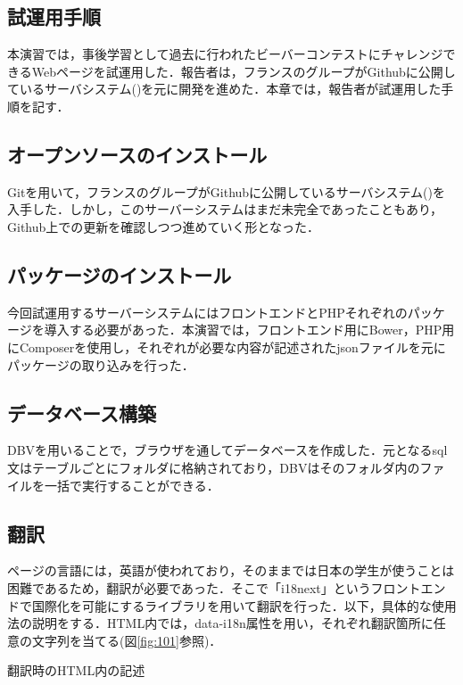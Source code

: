 \documentclass[a4paper]{jarticle}
\makeatletter
\newenvironment{figurehere}
  {\def\@captype{figure}}
  {}
\makeatother
\begin{document}
\begin{multicols}{2}
\fi	%

\section{試運用手順}
本演習では，事後学習として過去に行われたビーバーコンテストにチャレンジできるWebページを試運用した．報告者は，フランスのグループがGithubに公開しているサーバシステム(\cite{bebras-france-platform})を元に開発を進めた．本章では，報告者が試運用した手順を記す．
\subsection{オープンソースのインストール}
Gitを用いて，フランスのグループがGithubに公開しているサーバシステム(\cite{bebras-france-platform})を入手した．しかし，このサーバーシステムはまだ未完全であったこともあり，Github上での更新を確認しつつ進めていく形となった．

\subsection{パッケージのインストール}
今回試運用するサーバーシステムにはフロントエンドとPHPそれぞれのパッケージを導入する必要があった．本演習では，フロントエンド用にBower，PHP用にComposerを使用し，それぞれが必要な内容が記述されたjsonファイルを元にパッケージの取り込みを行った．

\subsection{データベース構築}
DBVを用いることで，ブラウザを通してデータベースを作成した．元となるsql文はテーブルごとにフォルダに格納されており，DBVはそのフォルダ内のファイルを一括で実行することができる．

\subsection{翻訳}
ページの言語には，英語が使われており，そのままでは日本の学生が使うことは困難であるため，翻訳が必要であった．そこで「i18next」というフロントエンドで国際化を可能にするライブラリを用いて翻訳を行った．以下，具体的な使用法の説明をする．HTML内では，data-i18n属性を用い，それぞれ翻訳箇所に任意の文字列を当てる(図\ref{fig:101}参照)．

\begin{figurehere}
\begin{center}
\end{center}
\caption{翻訳時のHTML内の記述}\label{fig:101}
\end{figurehere}


\end{multicols}
\end{document}
